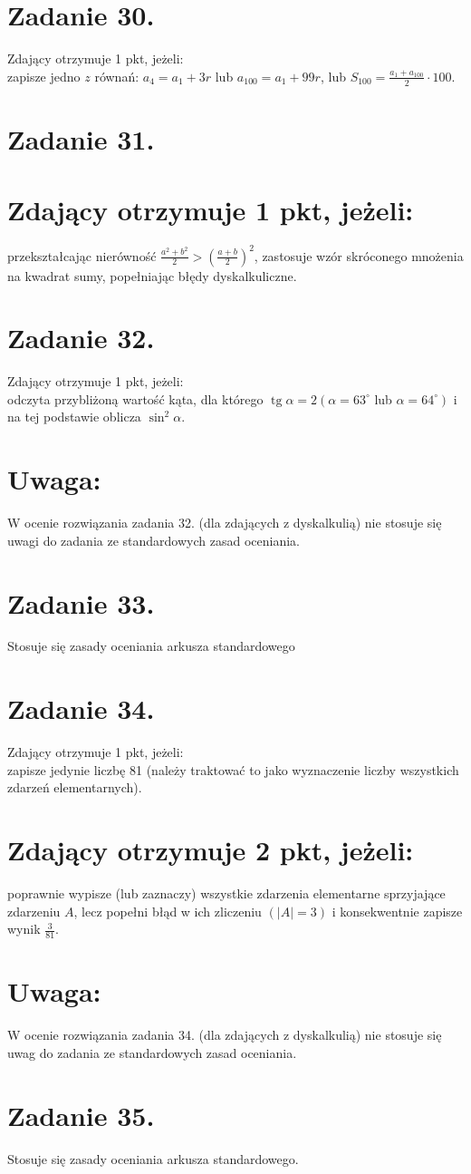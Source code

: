 \documentclass[10pt]{article}
\begin{document}
\section*{Zadanie 30.}
Zdający otrzymuje 1 pkt, jeżeli:\\
zapisze jedno $z$ równań: $a_{4}=a_{1}+3 r$ lub $a_{100}=a_{1}+99 r$, lub $S_{100}=\frac{a_{1}+a_{100}}{2} \cdot 100$.

\section*{Zadanie 31.}
\section*{Zdający otrzymuje 1 pkt, jeżeli:}
przekształcając nierówność $\frac{a^{2}+b^{2}}{2}>\left(\frac{a+b}{2}\right)^{2}$, zastosuje wzór skróconego mnożenia na kwadrat sumy, popełniając błędy dyskalkuliczne.

\section*{Zadanie 32.}
Zdający otrzymuje 1 pkt, jeżeli:\\
odczyta przybliżoną wartość kąta, dla którego $\operatorname{tg} \alpha=2\left(\alpha=63^{\circ}\right.$ lub $\left.\alpha=64^{\circ}\right)$ i na tej podstawie oblicza $\sin ^{2} \alpha$.

\section*{Uwaga:}
W ocenie rozwiązania zadania 32. (dla zdających z dyskalkulią) nie stosuje się uwagi do zadania ze standardowych zasad oceniania.

\section*{Zadanie 33.}
Stosuje się zasady oceniania arkusza standardowego

\section*{Zadanie 34.}
Zdający otrzymuje 1 pkt, jeżeli:\\
zapisze jedynie liczbę 81 (należy traktować to jako wyznaczenie liczby wszystkich zdarzeń elementarnych).

\section*{Zdający otrzymuje 2 pkt, jeżeli:}
poprawnie wypisze (lub zaznaczy) wszystkie zdarzenia elementarne sprzyjające\\
zdarzeniu $A$, lecz popełni błąd w ich zliczeniu $(|A|=3)$ i konsekwentnie zapisze wynik $\frac{3}{81}$.

\section*{Uwaga:}
W ocenie rozwiązania zadania 34. (dla zdających z dyskalkulią) nie stosuje się uwag do zadania ze standardowych zasad oceniania.

\section*{Zadanie 35.}
Stosuje się zasady oceniania arkusza standardowego.
\end{document}

